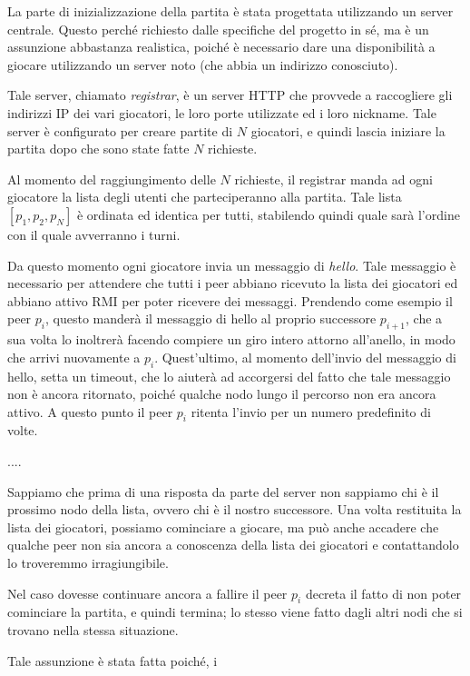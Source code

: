 \documentclass[10.5pt]{article}
\begin{document}
La parte di inizializzazione della partita è stata progettata utilizzando un server centrale. Questo perché richiesto dalle specifiche del progetto in sé, ma è un assunzione abbastanza realistica, poiché è necessario dare una disponibilità a giocare utilizzando un server noto (che abbia un indirizzo conosciuto).

Tale server, chiamato \textit{registrar}, è un server HTTP che provvede a raccogliere gli indirizzi IP dei vari giocatori, le loro porte utilizzate ed i loro nickname. Tale server è configurato per creare partite di $N$ giocatori, e quindi lascia iniziare la partita dopo che sono state fatte $N$ richieste. 

Al momento del raggiungimento delle $N$ richieste, il registrar manda ad ogni giocatore la lista degli utenti che parteciperanno alla partita. Tale lista $[p_1, p_2, p_N]$ è ordinata ed identica per tutti, stabilendo quindi quale sarà l'ordine con il quale avverranno i turni.

Da questo momento ogni giocatore invia un messaggio di \textit{hello}. Tale messaggio è necessario per attendere che tutti i peer abbiano ricevuto la lista dei giocatori ed abbiano attivo RMI per poter ricevere dei messaggi. Prendendo come esempio il peer $p_i$, questo manderà il messaggio di hello al proprio successore $p_{i+1}$, che a sua volta lo inoltrerà facendo compiere un giro intero attorno all'anello, in modo che arrivi nuovamente a $p_i$. Quest'ultimo, al momento dell'invio del messaggio di hello, setta un timeout, che lo aiuterà ad accorgersi del fatto che tale messaggio non è ancora ritornato, poiché qualche nodo lungo il percorso non era ancora attivo. A questo punto il peer $p_i$ ritenta l'invio per un numero predefinito di volte. 

....

Sappiamo che prima di una risposta da parte del server non sappiamo chi è il prossimo nodo della lista, ovvero chi è il nostro successore. Una volta restituita la lista dei giocatori, possiamo cominciare a giocare, ma può anche accadere che qualche peer non sia ancora a conoscenza della lista dei giocatori e contattandolo lo troveremmo irragiungibile.



Nel caso dovesse continuare ancora a fallire il peer $p_i$ decreta il fatto di non poter cominciare la partita, e quindi termina; lo stesso viene fatto dagli altri nodi che si trovano nella stessa situazione.

Tale assunzione è stata fatta poiché, i
\end{document}
